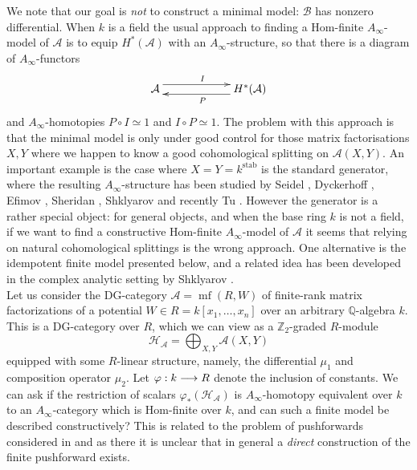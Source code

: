 \documentclass[english,letter paper,12pt,leqno]{article}
\theoremstyle{example}
\numberwithin{equation}{section}
\def\AA{\mathcal{A}}
\def\BB{\mathcal{B}}
\def\HH{\HH}
\def\HH{\mathcal{H}}
\def\stab{\operatorname{stab}}
\def\nZ{\mathds{Z}}
\DeclareMathOperator{\mfdg}{mf}
\begin{document}
We note that our goal is \emph{not} to construct a minimal model: $\BB$ has nonzero differential. When $k$ is a field the usual approach to finding a Hom-finite $A_\infty$-model of $\AA$ is to equip $H^*(\AA)$ with an $A_\infty$-structure, so that there is a diagram of $A_\infty$-functors
\[
\xymatrix@C+3pc{
\AA \ar@<1ex>[r]^I & H^*(\AA) \ar@<1ex>[l]^P
}
\]
and $A_\infty$-homotopies $P \circ I \simeq 1$ and $I \circ P \simeq 1$. The problem with this approach is that the minimal model is only under good control for those matrix factorisations $X,Y$ where we happen to know a good cohomological splitting on $\AA(X,Y)$. An important example is the case where $X = Y = k^{\stab}$ is the standard generator, where the resulting $A_\infty$-structure has been studied by Seidel \cite{??}, Dyckerhoff \cite{??}, Efimov \cite{??}, Sheridan \cite{??}, Shklyarov \cite{??} and recently Tu \cite{??}. However the generator is a rather special object: for general objects, and when the base ring $k$ is not a field, if we want to find a constructive Hom-finite $A_\infty$-model of $\AA$ it seems that relying on natural cohomological splittings is the wrong approach. One alternative is the idempotent finite model presented below, and a related idea has been developed in the complex analytic setting by Shklyarov \cite{??}.
\\

Let us consider the DG-category $\AA = \mfdg(R,W)$ of finite-rank matrix factorizations of a potential $W \in R = k[x_1,\ldots,x_n]$ over an arbitrary $\mathbb{Q}$-algebra $k$. This is a DG-category over $R$, which we can view as a $\nZ_2$-graded $R$-module
\[
\HH_{\AA} = \bigoplus_{X,Y} \AA(X,Y)
\]
equipped with some $R$-linear structure, namely, the differential $\mu_1$ and composition operator $\mu_2$. Let $\varphi: k \longrightarrow R$ denote the inclusion of constants. We can ask if the restriction of scalars $\varphi_*( \HH_{\AA} )$ is $A_\infty$-homotopy equivalent over $k$ to an $A_\infty$-category which is Hom-finite over $k$, and can such a finite model be described constructively? This is related to the problem of pushforwards considered in \cite{pushforward} and as there it is unclear that in general a \emph{direct} construction of the finite pushforward exists.
\end{document}
